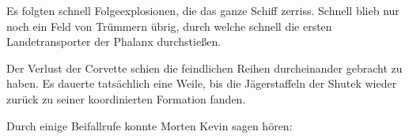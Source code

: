 Es folgten schnell Folgeexplosionen, die das ganze Schiff zerriss. Schnell blieb nur noch ein Feld von Trümmern übrig, durch welche schnell die ersten Landetransporter der Phalanx durchstießen.

\par

Der Verlust der Corvette schien die feindlichen Reihen durcheinander gebracht zu haben. Es dauerte tatsächlich eine Weile, bis die Jägerstaffeln der Shutek wieder zurück zu seiner koordinierten Formation fanden.

\par

Durch einige Beifallrufe konnte Morten Kevin sagen hören: 
